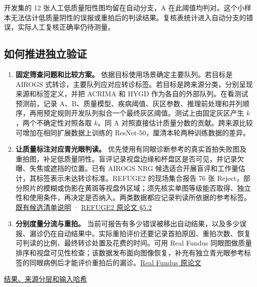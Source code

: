 \documentclass[
  10pt,
  letterpaper,
]{article}
\providecommand{\tightlist}{%
  \setlength{\itemsep}{0pt}\setlength{\parskip}{0pt}}
\begin{document}
开发集的 12 张人工低质量阳性图均留在自动分支，A
在此阈值均判对。这个小样本无法估计低质量阴性的误报或重拍后的判读结果。复核表统计进入自动分支的错误，实际人工复核正确率仍待测量。

\subsection{如何推进独立验证}\label{ux5982ux4f55ux63a8ux8fdbux72ecux7acbux9a8cux8bc1}

\begin{enumerate}
\def\labelenumi{\arabic{enumi}.}
\tightlist
\item
  \textbf{固定筛查问题和比较方案。}
  依据目标使用场景确定主要队列。若目标是 AIROGS
  式转诊，主要队列应对应转诊标签。若目标是跨来源分类，分别呈现来源和标签定义，并把
  ACRIMA 和 HYGD 作为各自的外部队列。在看测试预测前，记录
  A、B、质量模型、疾病阈值、灰区参数、推理前处理和并列顺序，再用预定规则开发队列拟合一个最终灰区阈值。测试上由固定灰区产生
  \(k\)，两个不确定性对照各取 \(k\)。同 A
  对照直接估计质量分数的贡献。跨来源比较可增加在相同扩展数据上训练的
  ResNet-50，厘清本轮两种训练数据的差异。
\item
  \textbf{让质量标注对应青光眼判读。}
  优先使用有同眼诊断参考的真实首拍失败图及重拍图，补足低质量阴性。盲评记录视盘边缘和杯盘区是否可见，并记录欠曝、失焦或遮挡的位置。已有
  AIROGS NRG
  候选适合开展盲评和工作量估计，其标签表示未达转诊标准。REFUGE2
  的现场集合报告 76 张
  Reject，部分照片的模糊或伪影在黄斑等视盘外区域；须先核实单图等级能否取得、独立性和使用条件，再决定是否纳入。两类数据都应记录判读所依据的参考标签。\href{quality-alignment.zh.md\#对项目下一步的意义}{既有候选清单说明}
  · \href{https://arxiv.org/html/2202.08994\#S5.SS2}{REFUGE2 原论文
  §5.2}
\item
  \textbf{分别度量分流与重拍。}
  当前可报告有多少错误被移出自动结果，以及多少误报、漏诊仍在自动结果中。实际重拍评价还要记录首拍原因、重拍次数、恢复可判读的比例、最终转诊处置及花费的时间。可用
  Real Fundus
  同眼图做质量排序和视盘可见性检查；该数据发布面向图像恢复，补充有独立青光眼参考标签的同眼病例后才能评价重拍后的漏诊。\href{https://arxiv.org/abs/2201.00466}{Real
  Fundus 原论文}
\end{enumerate}

\href{proposal-review-results.json}{结果、来源分层和输入哈希}
\end{document}
